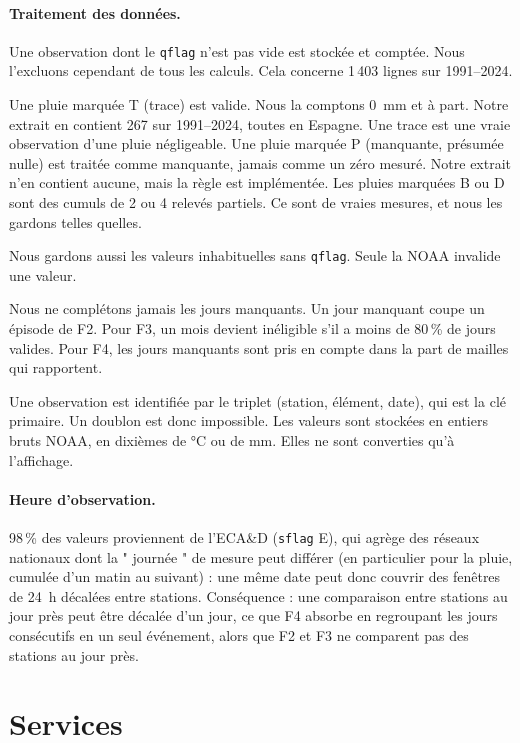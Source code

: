 \documentclass{rapportClass}
\newcommand{\cmd}[1]{\texttt{#1}}
\begin{document}
\paragraph{Traitement des données.} Une observation dont le \cmd{qflag} n'est pas vide est stockée et comptée.
Nous l'excluons cependant de tous les calculs. Cela concerne 1\,403 lignes sur 1991--2024.

Une pluie marquée T (trace) est valide. Nous la comptons 0~mm et à part. Notre extrait en contient 267 sur
1991--2024, toutes en Espagne. Une trace est une vraie observation d'une pluie négligeable. Une pluie marquée P
(manquante, présumée nulle) est traitée comme manquante, jamais comme un zéro mesuré. Notre extrait n'en contient
aucune, mais la règle est implémentée. Les pluies marquées B ou D sont des cumuls de 2 ou 4 relevés partiels.
Ce sont de vraies mesures, et nous les gardons telles quelles.

Nous gardons aussi les valeurs inhabituelles sans \cmd{qflag}. Seule la NOAA invalide une valeur.

Nous ne complétons jamais les jours manquants. Un jour manquant coupe un épisode de F2. Pour F3, un mois devient
inéligible s'il a moins de 80\,\% de jours valides. Pour F4, les jours manquants sont pris en compte dans la part
de mailles qui rapportent.

Une observation est identifiée par le triplet (station, élément, date), qui est la clé primaire. Un doublon est
donc impossible. Les valeurs sont stockées en entiers bruts NOAA, en dixièmes de °C ou de mm. Elles ne sont
converties qu'à l'affichage.

\paragraph{Heure d'observation.} 98\,\% des valeurs proviennent de
l'ECA\&D (\cmd{sflag} E), qui agrège des réseaux nationaux dont la " journée " de mesure peut différer (en particulier
pour la pluie, cumulée d'un matin au suivant) : une même date peut donc couvrir des fenêtres de 24~h décalées entre
stations. Conséquence : une comparaison entre stations au jour près peut être décalée d'un jour, ce que F4 absorbe
en regroupant les jours consécutifs en un seul événement, alors que F2 et F3 ne comparent pas des stations au jour près.

\section{Services}
\end{document}
